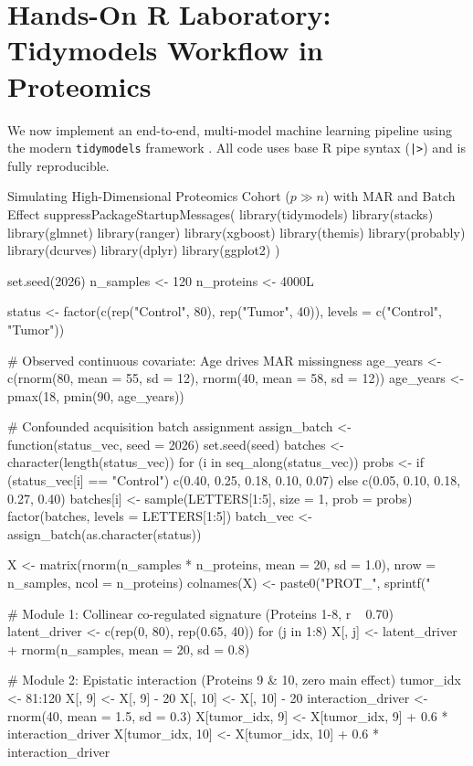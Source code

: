 \documentclass[11pt,oneside]{book}
\begin{document}
\section{Hands-On R Laboratory: Tidymodels Workflow in Proteomics}

We now implement an end-to-end, multi-model machine learning pipeline using the modern \texttt{tidymodels} framework \cite{kuhn2022tidymodels}. All code uses base R pipe syntax (\texttt{|>}) and is fully reproducible.

\begin{rchunk}{Simulating High-Dimensional Proteomics Cohort ($p \gg n$) with MAR and Batch Effect}
suppressPackageStartupMessages({
  library(tidymodels)
  library(stacks)
  library(glmnet)
  library(ranger)
  library(xgboost)
  library(themis)
  library(probably)
  library(dcurves)
  library(dplyr)
  library(ggplot2)
})

set.seed(2026)
n_samples  <- 120
n_proteins <- 4000L

status <- factor(c(rep("Control", 80), rep("Tumor", 40)), levels = c("Control", "Tumor"))

# Observed continuous covariate: Age drives MAR missingness
age_years <- c(rnorm(80, mean = 55, sd = 12), rnorm(40, mean = 58, sd = 12))
age_years <- pmax(18, pmin(90, age_years))

# Confounded acquisition batch assignment
assign_batch <- function(status_vec, seed = 2026) {
  set.seed(seed)
  batches <- character(length(status_vec))
  for (i in seq_along(status_vec)) {
    probs <- if (status_vec[i] == "Control") c(0.40, 0.25, 0.18, 0.10, 0.07) else c(0.05, 0.10, 0.18, 0.27, 0.40)
    batches[i] <- sample(LETTERS[1:5], size = 1, prob = probs)
  }
  factor(batches, levels = LETTERS[1:5])
}
batch_vec <- assign_batch(as.character(status))

X <- matrix(rnorm(n_samples * n_proteins, mean = 20, sd = 1.0), 
            nrow = n_samples, ncol = n_proteins)
colnames(X) <- paste0("PROT_", sprintf("%

# Module 1: Collinear co-regulated signature (Proteins 1-8, r ~ 0.70)
latent_driver <- c(rep(0, 80), rep(0.65, 40))
for (j in 1:8) {
  X[, j] <- latent_driver + rnorm(n_samples, mean = 20, sd = 0.8)
}

# Module 2: Epistatic interaction (Proteins 9 & 10, zero main effect)
tumor_idx <- 81:120
X[, 9]  <- X[, 9]  - 20
X[, 10] <- X[, 10] - 20
interaction_driver <- rnorm(40, mean = 1.5, sd = 0.3)
X[tumor_idx, 9]  <- X[tumor_idx, 9]  + 0.6 * interaction_driver
X[tumor_idx, 10] <- X[tumor_idx, 10] + 0.6 * interaction_driver


\end{rchunk}
\end{document}
